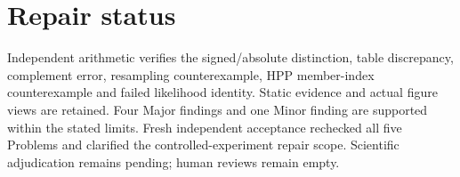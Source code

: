 \documentclass[10pt]{article}
\begin{document}
\section*{Repair status}
Independent arithmetic verifies the signed/absolute distinction, table discrepancy, complement error, resampling counterexample, HPP member-index counterexample and failed likelihood identity. Static evidence and actual figure views are retained. Four Major findings and one Minor finding are supported within the stated limits. Fresh independent acceptance rechecked all five Problems and clarified the controlled-experiment repair scope. Scientific adjudication remains pending; human reviews remain empty.\par
\end{document}
